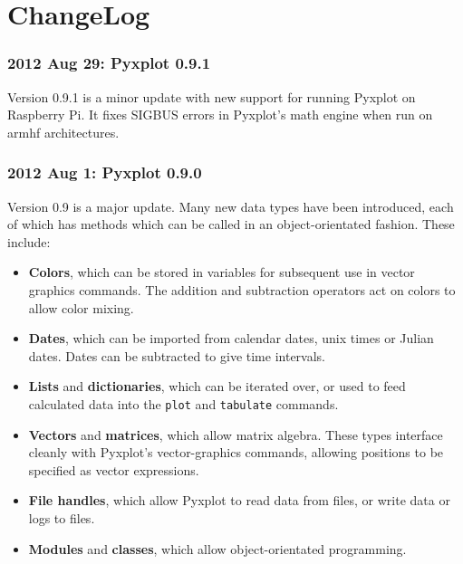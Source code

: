 %
%
%
%
%



\chapter{ChangeLog}

\subsection*{2012 Aug 29: Pyxplot 0.9.1}

Version 0.9.1 is a minor update with new support for running Pyxplot on Raspberry Pi. It fixes SIGBUS errors in Pyxplot's math engine when run on armhf architectures.

\subsection*{2012 Aug 1: Pyxplot 0.9.0}

Version 0.9 is a major update. Many new data types have been introduced, each
of which has methods which can be called in an object-orientated fashion. These
include:

\begin{itemize}
\item {\bf Colors}, which can be stored in variables for subsequent use in vector graphics commands. The addition and subtraction operators act on colors to allow color mixing.
\item {\bf Dates}, which can be imported from calendar dates, unix times or Julian dates. Dates can be subtracted to give time intervals.
\item {\bf Lists} and {\bf dictionaries}, which can be iterated over, or used to feed calculated data into the {\tt plot} and {\tt tabulate} commands.
\item {\bf Vectors} and {\bf matrices}, which allow matrix algebra. These types interface cleanly with Pyxplot's vector-graphics commands, allowing positions to be specified as vector expressions.
\item {\bf File handles}, which allow Pyxplot to read data from files, or write data or logs to files.
\item {\bf Modules} and {\bf classes}, which allow object-orientated programming.
\end{itemize}

